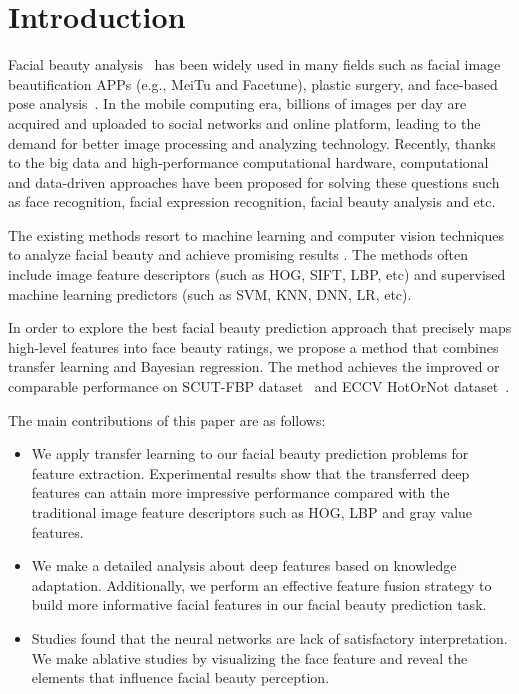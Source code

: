 \documentclass[a4paper,conference]{IEEEtran}
\begin{document}
\IEEEpeerreviewmaketitle



\section{Introduction}

Facial beauty analysis~\cite{Perrett1994Facial} has been widely used in many
  fields such as facial image beautification APPs (e.g., MeiTu and Facetune),
  plastic surgery, and face-based pose analysis~\cite{Liu17}.
  In the mobile computing era, billions of images per day are acquired and uploaded
  to social networks and online platform, leading to the demand for
  better image processing and analyzing technology. Recently, thanks to the
  big data and high-performance computational hardware,
  computational and data-driven approaches have been proposed for
  solving these questions such as face recognition, facial
  expression recognition, facial beauty analysis and etc.

  The existing methods resort to machine learning and computer vision techniques
  to analyze facial beauty and achieve promising results \cite{zhang2016computer}.
  The methods often include image feature descriptors (such as HOG, SIFT, LBP, etc)
  and supervised machine learning predictors (such as SVM, KNN, DNN, LR, etc).

  In order to explore the best facial beauty prediction approach that precisely
  maps high-level features into face beauty ratings, we propose a method that
  combines transfer learning and Bayesian regression. The method achieves the
  improved or comparable performance on SCUT-FBP dataset~\cite{xie2015scut} and
  ECCV HotOrNot dataset~\cite{gray2010predicting}.

  The main contributions of this paper are  as follows:
\begin{itemize}
  \item
    We apply transfer learning to our facial beauty prediction problems for
    feature extraction. Experimental results show that the transferred deep
    features can attain more impressive performance compared with the
    traditional image feature descriptors such as HOG, LBP and gray
    value features.
  \item
    We make a detailed analysis about deep features based on knowledge adaptation.
    Additionally, we perform an effective feature fusion strategy to build more
    informative facial features in our facial beauty prediction task.
  \item
    Studies found that the neural networks are lack of satisfactory
    interpretation. We make ablative studies by visualizing the face feature and
    reveal the elements that influence facial beauty perception.

\end{itemize}
\end{document}
